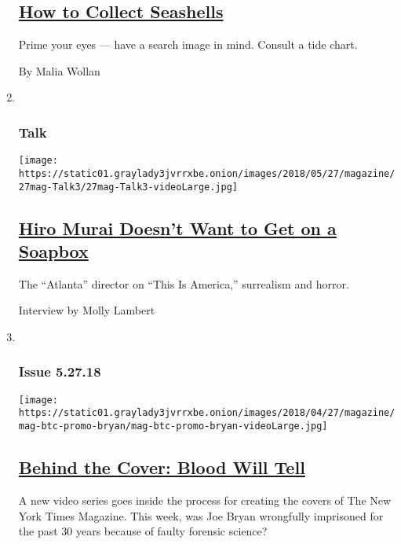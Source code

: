 \begin{enumerate}
  \hypertarget{how-to-collect-seashells}{%
  \subsection{\texorpdfstring{\href{/2018/05/23/magazine/how-to-collect-seashells.html}{How
  to Collect
  Seashells}}{How to Collect Seashells}}\label{how-to-collect-seashells}}

  Prime your eyes --- have a search image in mind. Consult a tide chart.

  By Malia Wollan
\item ~
  \hypertarget{talk}{%
  \subsubsection{Talk}\label{talk}}

  \texttt{[image: https://static01.graylady3jvrrxbe.onion/images/2018/05/27/magazine/27mag-Talk3/27mag-Talk3-videoLarge.jpg]}

  \hypertarget{hiro-murai-doesnt-want-to-get-on-a-soapbox}{%
  \subsection{\texorpdfstring{\href{/2018/05/22/magazine/hiro-murai-doesnt-want-to-get-on-a-soapbox.html}{Hiro
  Murai Doesn't Want to Get on a
  Soapbox}}{Hiro Murai Doesn't Want to Get on a Soapbox}}\label{hiro-murai-doesnt-want-to-get-on-a-soapbox}}

  The ``Atlanta'' director on ``This Is America,'' surrealism and
  horror.

  Interview by Molly Lambert
\item ~
  \hypertarget{issue-52718}{%
  \subsubsection{Issue 5.27.18}\label{issue-52718}}

  \texttt{[image: https://static01.graylady3jvrrxbe.onion/images/2018/04/27/magazine/mag-btc-promo-bryan/mag-btc-promo-bryan-videoLarge.jpg]}

  \hypertarget{behind-the-cover-blood-will-tell}{%
  \subsection{\texorpdfstring{\href{/2018/05/23/magazine/behind-the-cover-blood-will-tell-part-i.html}{Behind
  the Cover: Blood Will
  Tell}}{Behind the Cover: Blood Will Tell}}\label{behind-the-cover-blood-will-tell}}

  A new video series goes inside the process for creating the covers of
  The New York Times Magazine. This week, was Joe Bryan wrongfully
  imprisoned for the past 30 years because of faulty forensic science?
\end{enumerate}


